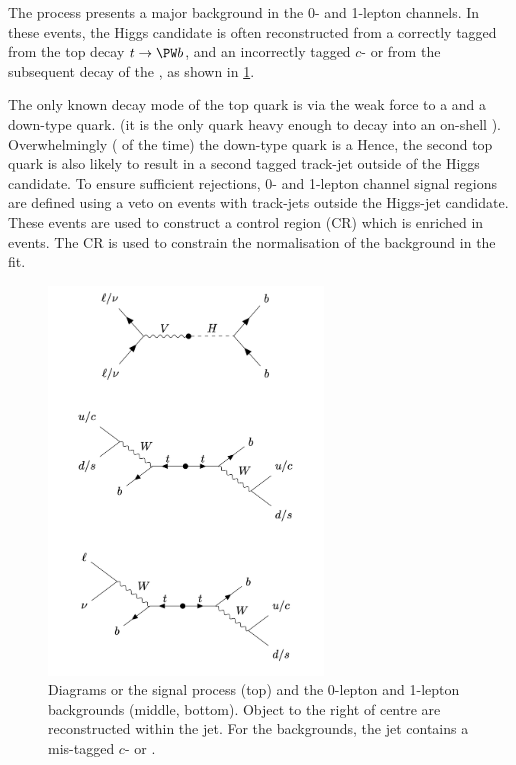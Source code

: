 The \ttbar process presents a major background in the 0- and 1-lepton channels.
In these events, the Higgs candidate is often reconstructed from a correctly tagged \bjet from the top decay $t \to \Wboson b$, and an incorrectly tagged $c$- or \ljet from the subsequent decay of the \Wboson, as shown in \cref{fig:sr_cr_diagrams}.

The only known decay mode of the top quark is via the weak force to a \Wboson and a down-type quark. (it is the only quark heavy enough to decay into an on-shell \Wboson).
Overwhelmingly ( of the time) the down-type quark is a \bquark
Hence, the second top quark is also likely to result in a second tagged \btagged track-jet outside of the \largeR Higgs candidate.
To ensure sufficient \ttbar rejections, 0- and 1-lepton channel signal regions are defined using a veto on events with \btagged track-jets outside the Higgs-jet candidate.
These events are used to construct a control region (CR) which is enriched in \ttbar events.
The CR is used to constrain the normalisation of the \ttbar background in the fit.

%
\begin{figure}[!htbp]
  \centering
  \includegraphics[width=0.65\textwidth]{chapters/6.vhbb_boosted/figs/sr_cr_diagrams.pdf}
  \caption{
    Diagrams or the signal process (top) and the 0-lepton and 1-lepton \ttbar backgrounds (middle, bottom).
    Object to the right of centre are reconstructed within the \largeR jet.
    For the backgrounds, the \largeR jet contains a mis-tagged $c$- or \ljet.
  }
  \label{fig:sr_cr_diagrams}
\end{figure}
%

